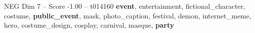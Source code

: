 \begin{textsample}{NEG Dim 7 – Score -1.00 – t014160}  \label{ex:f7_neg_006}
\textbf{event}, entertainment, fictional\_character, costume, \textbf{public\_event}, mask, photo\_caption, festival, demon, internet\_meme, hero, costume\_design, cosplay, carnival, masque, \textbf{party}

\end{textsample}
